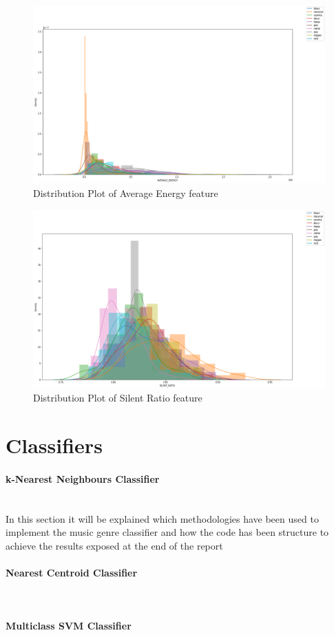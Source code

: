 \documentclass[12pt]{article}
\begin{document}
	\begin{figure}[H]
		\hspace{40pt}\includegraphics[scale=0.55]{visual_5_1}
		\caption{Distribution Plot of Average Energy feature}
	\end{figure}
	
	\begin{figure}[H]
		\hspace{40pt}\includegraphics[scale=0.55]{visual_6_1}
		\caption{Distribution Plot of Silent Ratio feature}
	\end{figure}

	
	\section{Classifiers}
	\paragraph{k-Nearest Neighbours Classifier}\mbox{}\\\newline
	In this section it will be explained which methodologies have been used to implement the music genre classifier and how the code has been structure to achieve the results exposed at the end of the report 
	\paragraph{Nearest Centroid Classifier}\mbox{}\\\newline
	\paragraph{Multiclass SVM Classifier}\mbox{}\\\newline
		
	\printbibliography
\end{document}
